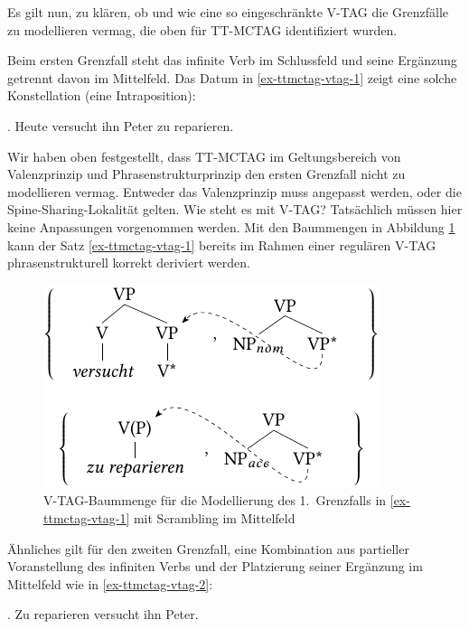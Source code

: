 Es gilt nun, zu klären, ob und wie eine so eingeschränkte V-TAG die Grenzfälle zu modellieren vermag, die oben für TT-MCTAG identifiziert wurden.



Beim ersten Grenzfall steht das infinite Verb im Schlussfeld und seine Ergänzung getrennt davon im Mittelfeld. Das Datum in \ref{ex-ttmctag-vtag-1} zeigt eine solche Konstellation (eine Intraposition):

\ex. Heute versucht ihn Peter zu reparieren. \label{ex-ttmctag-vtag-1}

Wir haben oben festgestellt, dass TT-MCTAG im Geltungsbereich von Valenzprinzip und Phrasenstrukturprinzip den ersten Grenzfall nicht zu modellieren vermag. Entweder das Valenzprinzip muss angepasst werden, oder die Spine-Sharing-Lokalität gelten. Wie steht es mit V-TAG? Tatsächlich müssen hier keine Anpassungen vorgenommen werden. Mit den Baummengen in Abbildung \ref{fig-ttmctag-vtag-1} kann der Satz \ref{ex-ttmctag-vtag-1} bereits im Rahmen einer regulären V-TAG phrasenstrukturell korrekt deriviert werden.

\begin{figure}[t]
\centering
\includegraphics{graphics/abb741.pdf}
\caption{\label{fig-ttmctag-vtag-1}V-TAG-Baummenge für die Modellierung des 1.~Grenzfalls in \ref{ex-ttmctag-vtag-1} mit Scrambling im Mittelfeld}
\end{figure}

Ähnliches gilt für den zweiten Grenzfall, eine Kombination aus partieller Voranstellung des infiniten Verbs und der Platzierung seiner Ergänzung im Mittelfeld wie in \ref{ex-ttmctag-vtag-2}:

\ex. Zu reparieren versucht ihn Peter. \label{ex-ttmctag-vtag-2}

